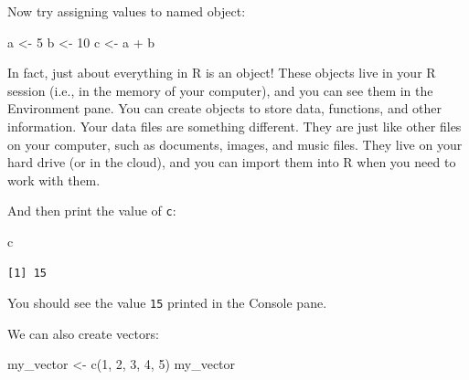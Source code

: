 \documentclass[
  letterpaper,
  8pt,
  a4paper]{book}
\newenvironment{Shaded}{\begin{snugshade}}{\end{snugshade}}
\newcommand{\DecValTok}[1]{\textcolor[rgb]{0.68,0.00,0.00}{#1}}
\newcommand{\FunctionTok}[1]{\textcolor[rgb]{0.28,0.35,0.67}{#1}}
\newcommand{\NormalTok}[1]{\textcolor[rgb]{0.00,0.23,0.31}{#1}}
\newcommand{\OtherTok}[1]{\textcolor[rgb]{0.00,0.23,0.31}{#1}}
\newcommand{\SpecialCharTok}[1]{\textcolor[rgb]{0.37,0.37,0.37}{#1}}
\begin{document}
Now try assigning values to named object:

\begin{Shaded}
\begin{Highlighting}[]
\NormalTok{a }\OtherTok{\textless{}{-}} \DecValTok{5}
\NormalTok{b }\OtherTok{\textless{}{-}} \DecValTok{10}
\NormalTok{c }\OtherTok{\textless{}{-}}\NormalTok{ a }\SpecialCharTok{+}\NormalTok{ b}
\end{Highlighting}
\end{Shaded}

\begin{tcolorbox}[enhanced jigsaw, arc=.35mm, bottomrule=.15mm, bottomtitle=1mm, breakable, colback=white, colbacktitle=quarto-callout-note-color!10!white, colframe=quarto-callout-note-color-frame, coltitle=black, left=2mm, leftrule=.75mm, opacityback=0, opacitybacktitle=0.6, rightrule=.15mm, title=\textcolor{quarto-callout-note-color}{\faInfo}\hspace{0.5em}{Note}, titlerule=0mm, toprule=.15mm, toptitle=1mm]

In fact, just about everything in R is an object! These objects live in
your R session (i.e., in the memory of your computer), and you can see
them in the Environment pane. You can create objects to store data,
functions, and other information. Your data files are something
different. They are just like other files on your computer, such as
documents, images, and music files. They live on your hard drive (or in
the cloud), and you can import them into R when you need to work with
them.

\end{tcolorbox}

And then print the value of \texttt{c}:

\begin{Shaded}
\begin{Highlighting}[]
\NormalTok{c}
\end{Highlighting}
\end{Shaded}

\begin{verbatim}
[1] 15
\end{verbatim}

You should see the value \texttt{15} printed in the Console pane.

We can also create vectors:

\begin{Shaded}
\begin{Highlighting}[]
\NormalTok{my\_vector }\OtherTok{\textless{}{-}} \FunctionTok{c}\NormalTok{(}\DecValTok{1}\NormalTok{, }\DecValTok{2}\NormalTok{, }\DecValTok{3}\NormalTok{, }\DecValTok{4}\NormalTok{, }\DecValTok{5}\NormalTok{)}
\NormalTok{my\_vector}
\end{Highlighting}
\end{Shaded}
\end{document}
